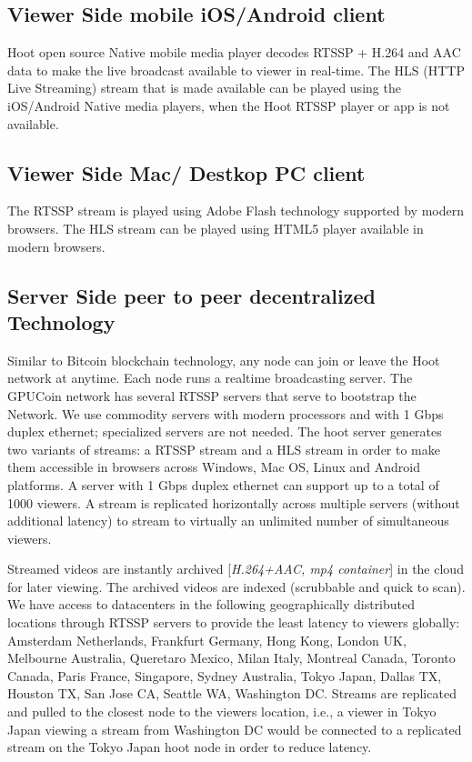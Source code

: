 \subsection{Viewer Side mobile iOS/Android client }
 Hoot open source Native mobile media player decodes RTSSP + H.264 and AAC data to make the live broadcast available to viewer in real-time. The HLS (HTTP Live Streaming) stream that is made available can be played using the iOS/Android Native media players, when the Hoot RTSSP player or app is not available.

\subsection{Viewer Side Mac/ Destkop PC client} 
The RTSSP stream is played using Adobe Flash technology supported by modern browsers. The HLS stream can be played using HTML5 player available in modern browsers.

\subsection{Server Side peer to peer decentralized Technology}
Similar to Bitcoin blockchain technology, any node can join or leave the Hoot network at anytime. Each node runs a realtime broadcasting server.
The GPUCoin network has several RTSSP servers that serve to bootstrap the Network. We use commodity servers with modern processors and with 1 Gbps duplex ethernet; specialized servers are not needed. The hoot server generates two variants of streams: a RTSSP stream and a HLS stream in order to make them accessible in browsers across Windows, Mac OS, Linux and Android platforms. A server with 1 Gbps duplex ethernet can support up to a total of 1000 viewers. A stream is replicated horizontally across multiple servers (without additional latency) to stream to virtually an unlimited number of simultaneous viewers. 

Streamed videos are instantly archived [\emph{H.264+AAC, mp4 container}] in the cloud for later viewing. The archived videos are indexed (scrubbable and quick to scan). We have access to datacenters in the following geographically distributed locations through RTSSP servers to provide the least latency to viewers globally: Amsterdam Netherlands, Frankfurt Germany, Hong Kong, London UK, Melbourne Australia, Queretaro Mexico, Milan Italy, Montreal Canada, Toronto Canada, Paris France, Singapore, Sydney Australia, Tokyo Japan, Dallas TX, Houston TX, San Jose CA, Seattle WA, Washington DC. 
Streams are replicated and pulled to the closest node to the viewers location, i.e., a viewer in Tokyo Japan viewing a stream from Washington DC would be connected to a replicated stream on the Tokyo Japan hoot node in order to reduce latency.


